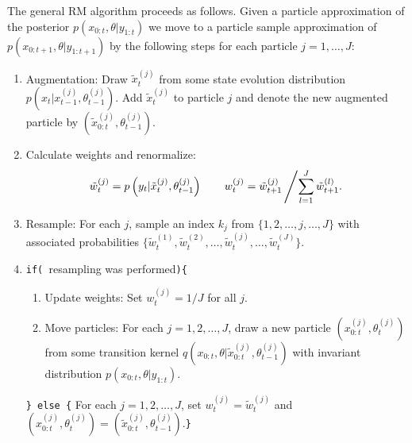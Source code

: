 The general RM algorithm proceeds as follows. Given a particle approximation of the posterior $p(x_{0:t},\theta|y_{1:t})$ we move to a particle sample approximation of $p(x_{0:t+1},\theta|y_{1:t+1})$ by the following steps for each particle $j=1,\ldots,J$:
\begin{enumerate}
\item Augmentation: Draw $\tilde{x}^{(j)}_t$ from some state evolution distribution $p\left(x_t|x^{(j)}_{t-1},\theta^{(j)}_{t-1}\right)$. Add $\tilde{x}^{(j)}_t$ to particle $j$ and denote the new augmented particle by $\left(\tilde{x}^{(j)}_{0:t},\theta^{(j)}_{t-1}\right)$.
\item Calculate weights and renormalize: 
    \[\tilde{w}^{(j)}_t = p\left(y_t|\tilde{x}^{(j)}_t,\theta^{(j)}_{t-1}\right) \qquad w^{(j)}_t = \tilde{w}_{t+1}^{(j)}\left/\sum_{l=1}^J \tilde{w}_{t+1}^{(l)}. \right.\]
\item Resample: For each $j$, sample an index $k_j$ from $\{1,2,\ldots,j,\ldots,J\}$ with associated probabilities $\{\tilde{w}^{(1)}_t,\tilde{w}^{(2)}_t,\ldots,\tilde{w}^{(j)}_t,\ldots,\tilde{w}^{(J)}_t\}$.
\item {\tt if( }resampling was performed{\tt )\{} \\
\begin{enumerate}[label=\alph*.]
\item Update weights: Set $w^{(j)}_t = 1 / J$ for all $j$.
\item \label{step:move} Move particles: For each $j = 1,2,\ldots,J$, draw a new particle $\left(x^{(j)}_{0:t},\theta^{(j)}_t\right)$ from some transition kernel $q\left(x_{0:t},\theta|\tilde{x}^{(j)}_{0:t},\theta^{(j)}_{t-1}\right)$ with invariant distribution $p(x_{0:t},\theta|y_{1:t})$.
\end{enumerate}
{\tt \} else \{} For each $j = 1,2,\ldots,J$, set $w^{(j)}_t = \tilde{w}^{(j)}_t$ and $\left(x^{(j)}_{0:t},\theta^{(j)}_t\right) = \left(\tilde{x}^{(j)}_{0:t},\theta^{(j)}_{t-1}\right)$.{\tt\}}
\end{enumerate}

